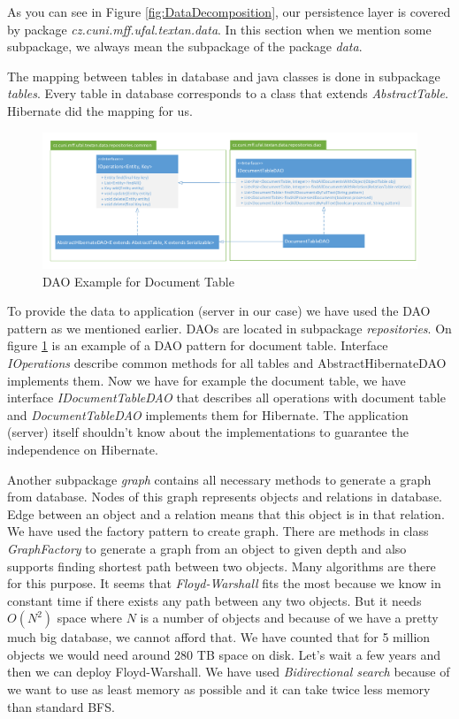 As you can see in Figure \ref{fig:DataDecomposition}, our persistence layer is
covered by package \emph{cz.cuni.mff.ufal.textan.data}. In this section when we
mention some subpackage, we always mean the subpackage of the package \emph{data}.

The mapping between tables in database and java classes is done in subpackage
\emph{tables}. Every table in database corresponds to a class that extends
\emph{AbstractTable}. Hibernate did the mapping for us. 

\begin{figure}[!htb]
        \centering
        \includegraphics[width=\textwidth]{Images/DatabaseDAO}
        \caption{DAO Example for Document Table}
        \label{fig:DatabaseDAO}
\end{figure}

To provide the data to application (server in our case) we have used the DAO pattern
as we mentioned earlier. DAOs are located in subpackage \emph{repositories}. On figure
\ref{fig:DatabaseDAO} is an example of a DAO pattern for document table. Interface
\emph{IOperations} describe common methods for all tables and AbstractHibernateDAO
implements them. Now we have for example the document table, we have interface
\emph{IDocumentTableDAO} that describes all operations with document table and
\emph{DocumentTableDAO} implements them for Hibernate. The application (server)
itself shouldn't know about the implementations to guarantee the independence
on Hibernate.

Another subpackage \emph{graph} contains all necessary methods to generate a graph
from database. Nodes of this graph represents objects and relations in database.
Edge between an object and a relation means that this object is in that relation.
We have used the factory pattern to create graph. There are methods in class
\emph{GraphFactory} to generate a graph from an object to given depth and also
supports finding shortest path between two objects. Many algorithms are there for this purpose. It seems that \emph{Floyd-Warshall} fits the most because we know in constant time if there exists any path between any two objects. But it needs $O(N^2)$ space where $N$ is a number of objects and because of we have a pretty much big database, we cannot afford that. We have counted that for 5 million objects we would need around 280 TB space on disk. Let's wait a few years and then we can deploy Floyd-Warshall. We have used \emph{Bidirectional search} because of we want to use as least memory as possible and it can take twice less memory than standard BFS.

